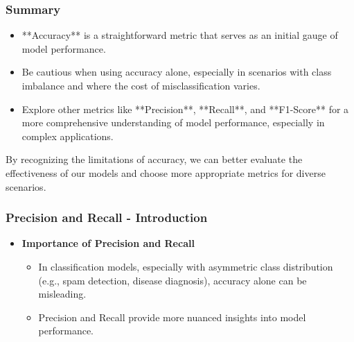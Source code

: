 \documentclass[aspectratio=169]{beamer}
\begin{document}
\begin{frame}[fragile]
    \frametitle{Summary}
    \begin{itemize}
        \item **Accuracy** is a straightforward metric that serves as an initial gauge of model performance.
        \item Be cautious when using accuracy alone, especially in scenarios with class imbalance and where the cost of misclassification varies.
        \item Explore other metrics like **Precision**, **Recall**, and **F1-Score** for a more comprehensive understanding of model performance, especially in complex applications.
    \end{itemize}

    By recognizing the limitations of accuracy, we can better evaluate the effectiveness of our models and choose more appropriate metrics for diverse scenarios.
\end{frame}

\begin{frame}[fragile]
    \frametitle{Precision and Recall - Introduction}
    \begin{itemize}
        \item \textbf{Importance of Precision and Recall} 
        \begin{itemize}
            \item In classification models, especially with asymmetric class distribution (e.g., spam detection, disease diagnosis), accuracy alone can be misleading.
            \item Precision and Recall provide more nuanced insights into model performance.
        \end{itemize}
    \end{itemize}
\end{frame}
\end{document}
